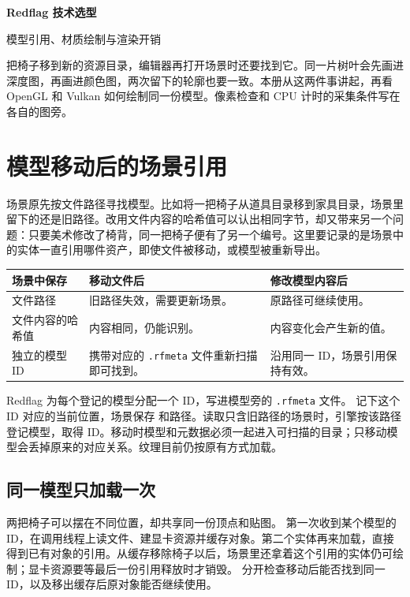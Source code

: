 
\newcommand{\loc}[1]{\par{\footnotesize\color{muted}源码见 \path{#1}。}\par}
\renewcommand{\note}[1]{\par{\small\color{muted}#1\par}}

\raggedright\setlength{\parindent}{2\ccwd}
{\Huge\bfseries Redflag 技术选型}\par\vspace{5pt}
{\Large\color{muted}模型引用、材质绘制与渲染开销}\par
{}

把椅子移到新的资源目录，编辑器再打开场景时还要找到它。同一片树叶会先画进深度图，再画进颜色图，两次留下的轮廓也要一致。本册从这两件事讲起，再看 OpenGL 和 Vulkan 如何绘制同一份模型。像素检查和 CPU 计时的采集条件写在各自的图旁。

\section{模型移动后的场景引用}
场景原先按文件路径寻找模型。比如将一把椅子从道具目录移到家具目录，场景里留下的还是旧路径。改用文件内容的哈希值可以认出相同字节，却又带来另一个问题：只要美术修改了椅背，同一把椅子便有了另一个编号。这里要记录的是场景中的实体一直引用哪件资产，即使文件被移动，或模型被重新导出。
\begin{tabularx}{\textwidth}{L{3cm}YY}
\toprule
场景中保存 & 移动文件后 & 修改模型内容后 \\
\midrule
文件路径 & 旧路径失效，需要更新场景。 & 原路径可继续使用。 \\
文件内容的哈希值 & 内容相同，仍能识别。 & 内容变化会产生新的值。 \\
独立的模型 ID & 携带对应的 \texttt{.rfmeta} 文件重新扫描即可找到。 & 沿用同一 ID，场景引用保持有效。 \\
\bottomrule
\end{tabularx}

Redflag 为每个登记的模型分配一个 ID，写进模型旁的 \texttt{.rfmeta} 文件。 记下这个 ID 对应的当前位置，场景保存  和路径。读取只含旧路径的场景时，引擎按该路径登记模型，取得 ID。移动时模型和元数据必须一起进入可扫描的目录；只移动模型会丢掉原来的对应关系。纹理目前仍按原有方式加载。

\subsection{同一模型只加载一次}
两把椅子可以摆在不同位置，却共享同一份顶点和贴图。 第一次收到某个模型的 ID，在调用线程上读文件、建显卡资源并缓存对象。第二个实体再来加载，直接得到已有对象的引用。从缓存移除椅子以后，场景里还拿着这个引用的实体仍可绘制；显卡资源要等最后一份引用释放时才销毁。
 分开检查移动后能否找到同一 ID，以及移出缓存后原对象能否继续使用。

